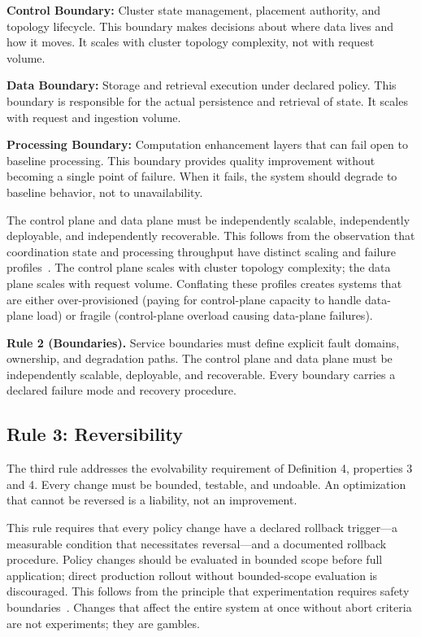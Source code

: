 \documentclass[conference]{IEEEtran}
\begin{document}
\textbf{Control Boundary:} Cluster state management, placement authority, and topology lifecycle. This boundary makes decisions about where data lives and how it moves. It scales with cluster topology complexity, not with request volume.

\textbf{Data Boundary:} Storage and retrieval execution under declared policy. This boundary is responsible for the actual persistence and retrieval of state. It scales with request and ingestion volume.

\textbf{Processing Boundary:} Computation enhancement layers that can fail open to baseline processing. This boundary provides quality improvement without becoming a single point of failure. When it fails, the system should degrade to baseline behavior, not to unavailability.

The control plane and data plane must be independently scalable, independently deployable, and independently recoverable. This follows from the observation that coordination state and processing throughput have distinct scaling and failure profiles~\cite{bigtable}. The control plane scales with cluster topology complexity; the data plane scales with request volume. Conflating these profiles creates systems that are either over-provisioned (paying for control-plane capacity to handle data-plane load) or fragile (control-plane overload causing data-plane failures).

\textbf{Rule 2 (Boundaries).} Service boundaries must define explicit fault domains, ownership, and degradation paths. The control plane and data plane must be independently scalable, deployable, and recoverable. Every boundary carries a declared failure mode and recovery procedure.

\subsection{Rule 3: Reversibility}

The third rule addresses the evolvability requirement of Definition 4, properties 3 and 4. Every change must be bounded, testable, and undoable. An optimization that cannot be reversed is a liability, not an improvement.

This rule requires that every policy change have a declared rollback trigger---a measurable condition that necessitates reversal---and a documented rollback procedure. Policy changes should be evaluated in bounded scope before full application; direct production rollout without bounded-scope evaluation is discouraged. This follows from the principle that experimentation requires safety boundaries~\cite{sre}. Changes that affect the entire system at once without abort criteria are not experiments; they are gambles.
\end{document}
